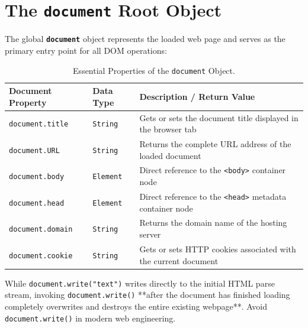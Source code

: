 \section{The \texttt{document} Root Object}

The global \textbf{\texttt{document}} object represents the loaded web page and serves as the primary entry point for all DOM operations:

\begin{table}[htbp]
\centering
\small
\renewcommand{\arraystretch}{1.3}
\begin{tabularx}{\linewidth}{ll>{\raggedright\arraybackslash}X}
\toprule
\textbf{Document Property} & \textbf{Data Type} & \textbf{Description / Return Value} \\
\midrule
\texttt{document.title} & \texttt{String} & Gets or sets the document title displayed in the browser tab \\
\texttt{document.URL} & \texttt{String} & Returns the complete URL address of the loaded document \\
\texttt{document.body} & \texttt{Element} & Direct reference to the \texttt{<body>} container node \\
\texttt{document.head} & \texttt{Element} & Direct reference to the \texttt{<head>} metadata container node \\
\texttt{document.domain} & \texttt{String} & Returns the domain name of the hosting server \\
\texttt{document.cookie} & \texttt{String} & Gets or sets HTTP cookies associated with the current document \\
\bottomrule
\end{tabularx}
\caption{Essential Properties of the \texttt{document} Object.}
\label{tab:document-props}
\end{table}

\begin{commonmistake}
While \texttt{document.write("text")} writes directly to the initial HTML parse stream, invoking \texttt{document.write()} **after the document has finished loading completely overwrites and destroys the entire existing webpage**. Avoid \texttt{document.write()} in modern web engineering.
\end{commonmistake}

